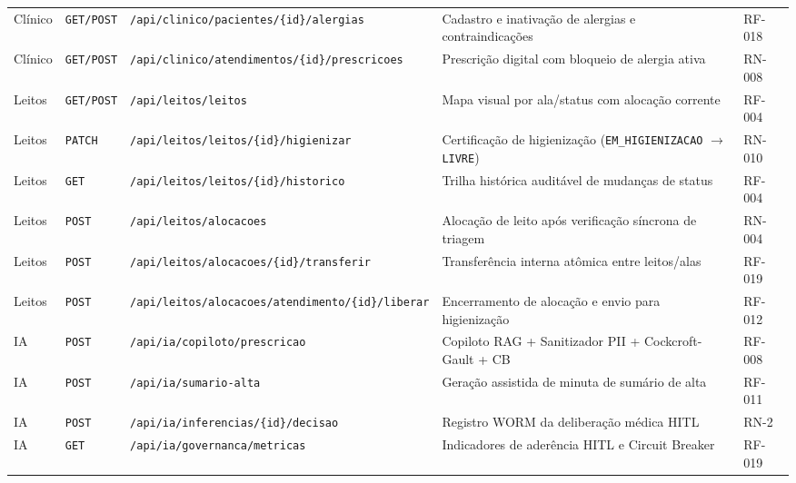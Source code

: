 \begin{table}[H]
\begin{tabularx}{\textwidth}{l l >{\raggedright\arraybackslash}p{4.8cm} >{\raggedright\arraybackslash}X l}
Clínico & \texttt{GET/POST} & \texttt{/api/clinico/pacientes/\{id\}/alergias} & Cadastro e inativação de alergias e contraindicações & RF-018 \\
Clínico & \texttt{GET/POST} & \texttt{/api/clinico/atendimentos/\{id\}/prescricoes} & Prescrição digital com bloqueio de alergia ativa & RN-008 \\
\midrule
Leitos & \texttt{GET/POST} & \texttt{/api/leitos/leitos} & Mapa visual por ala/status com alocação corrente & RF-004 \\
Leitos & \texttt{PATCH} & \texttt{/api/leitos/leitos/\{id\}/higienizar} & Certificação de higienização (\texttt{EM\_HIGIENIZACAO} $\to$ \texttt{LIVRE}) & RN-010 \\
Leitos & \texttt{GET} & \texttt{/api/leitos/leitos/\{id\}/historico} & Trilha histórica auditável de mudanças de status & RF-004 \\
Leitos & \texttt{POST} & \texttt{/api/leitos/alocacoes} & Alocação de leito após verificação síncrona de triagem & RN-004 \\
Leitos & \texttt{POST} & \texttt{/api/leitos/alocacoes/\{id\}/transferir} & Transferência interna atômica entre leitos/alas & RF-019 \\
Leitos & \texttt{POST} & \texttt{/api/leitos/alocacoes/atendimento/\{id\}/liberar} & Encerramento de alocação e envio para higienização & RF-012 \\
\midrule
IA & \texttt{POST} & \texttt{/api/ia/copiloto/prescricao} & Copiloto RAG + Sanitizador PII + Cockcroft-Gault + CB & RF-008 \\
IA & \texttt{POST} & \texttt{/api/ia/sumario-alta} & Geração assistida de minuta de sumário de alta & RF-011 \\
IA & \texttt{POST} & \texttt{/api/ia/inferencias/\{id\}/decisao} & Registro WORM da deliberação médica HITL & RN-2 \\
IA & \texttt{GET} & \texttt{/api/ia/governanca/metricas} & Indicadores de aderência HITL e Circuit Breaker & RF-019 \\
\bottomrule
\end{tabularx}
\end{table}
